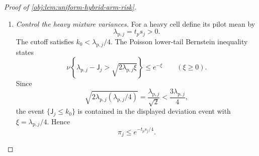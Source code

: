 \begin{proof}[Proof of \cref{obj:lem:uniform-hybrid-arm-risk}]
\begin{enumerate}
The pilot is independent of both branches. Consequently,
\[
\begin{aligned}
\mathbb E_\nu[\mathcal V_j]
&=\pi_j\mathbb E_\nu[\mathcal P_j]
+(1-\pi_j)\mathbb E_\nu[\mathcal H_j],\\
\mathbb E_\nu[\mathcal V_j^2]
&=\pi_j\mathbb E_\nu[\mathcal P_j^2]
+(1-\pi_j)\mathbb E_\nu[\mathcal H_j^2].
\end{aligned}
\]
Subtracting the square of the first identity from the second gives
\[
\operatorname{Var}_\nu(\mathcal V_j)
=
\pi_j\operatorname{Var}_\nu(\mathcal P_j)
+(1-\pi_j)\operatorname{Var}_\nu(\mathcal H_j)
+\pi_j(1-\pi_j)\delta_j^2.
\]

For \(0<s_j\le B\), the residual bound in
\cref{obj:lem:chebyshev-factorial-certificate} yields
\[
0\le v_j\bar\mu_jE_L(\zeta_j)
\le\frac{v_jB}{L^2s_j}
\le\frac B{\epsilon L^2}.
\]
The last inequality follows from \(\epsilon v_j\le s_j\). Using the branch means and \((x-y)^2\le2x^2+2y^2\), we obtain
\[
\pi_j(1-\pi_j)\delta_j^2
\le
2\left(\frac B{\epsilon L^2}\right)^2
+2\bigl(p_je^{-ts_j}\bigr)^2.
\]
For \(s_j=0\), the branch means vanish and the same bound applies.

Overlap and the elementary bound \(xe^{-x}\le e^{-1}\) for \(x\ge0\) give
\[
\bigl(p_je^{-ts_j}\bigr)^2
\le p_j^2e^{-2t\epsilon p_j}
\le\frac{p_j}{2e\,t\epsilon}.
\]
Thus
\[
\sum_{j\in\mathcal J_{\mathrm{light}}}
\pi_j(1-\pi_j)\delta_j^2
\le
2c_{\mathrm{light}}
\left(\frac B{\epsilon L^2}\right)^2
+\frac1{e\,t\epsilon}.
\]
Combining this with the polynomial variance bound and
\(0\le\pi_j\le1\) proves
\[
\begin{aligned}
\sum_{j\in\mathcal J_{\mathrm{light}}}
\operatorname{Var}_\nu(\mathcal V_j)
\le{}&
\sum_{j\in\mathcal J_{\mathrm{light}}}
\operatorname{Var}_\nu(\mathcal H_j)\\
&+6F_{\mathrm{grow}}
\left(
\frac{M_{\mathrm{light}}}{u\epsilon}
+\frac{M_{\mathrm{light}}}{t}
+\frac{c_{\mathrm{light}}B^2}{\epsilon^2}
\right)\\
&+2c_{\mathrm{light}}
\left(\frac B{\epsilon L^2}\right)^2
+\frac1{e\,t\epsilon}.
\end{aligned}
\]

\item \textit{Control the heavy mixture variances.}
For a heavy cell define its pilot mean by
\[
\lambda_{\mathrm p,j}=t_ps_j>0.
\]
The cutoff satisfies \(k_0<\lambda_{\mathrm p,j}/4\). The Poisson lower-tail Bernstein inequality states
\[
\nu\left\{
\lambda_{\mathrm p,j}-\mathsf J_j
>\sqrt{2\lambda_{\mathrm p,j}\xi}
\right\}\le e^{-\xi}
\qquad(\xi\ge0).
\]
Since
\[
\sqrt{2\lambda_{\mathrm p,j}(\lambda_{\mathrm p,j}/4)}
=\frac{\lambda_{\mathrm p,j}}{\sqrt2}
<\frac{3\lambda_{\mathrm p,j}}4,
\]
the event \(\{\mathsf J_j\le k_0\}\) is contained in the displayed deviation event with \(\xi=\lambda_{\mathrm p,j}/4\). Hence
\[
\pi_j\le e^{-t_ps_j/4}.
\]


\end{enumerate}
\end{proof}
